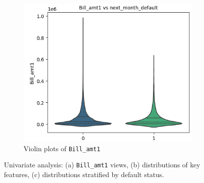 \documentclass[12pt,a4paper]{article}
\begin{document}
\begin{figure}[H]
\begin{subfigure}[b]{0.32\textwidth}
        \label{fig:univar_b}
    \end{subfigure}\hfill
    \begin{subfigure}[b]{0.32\textwidth}
        \centering
        \includegraphics[width=\linewidth]{figures/2c.png}
        \caption{Violin plots of \texttt{Bill\_amt1}}
        \label{fig:univar_c}
    \end{subfigure}
    \caption{Univariate analysis: (a) \texttt{Bill\_amt1} views, (b) distributions of key features, (c) distributions stratified by default status.}
    \label{fig:univar_combined}
\end{figure}




\end{document}
